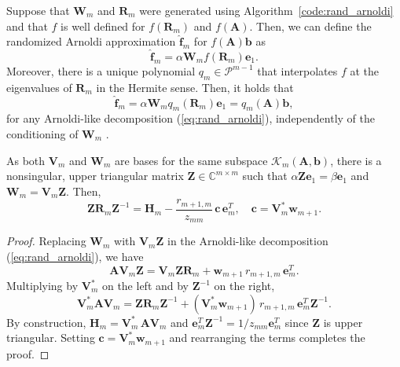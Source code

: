 \documentclass[smallextended]{svjour3}
\renewcommand{\vec}[1]{\mathbf{#1}}
\newcommand{\mat}[1]{\mathbf{#1}}
\begin{document}
\begin{proposition}
Suppose that $\mat{W}_m$ and $\mat{R}_m$ were generated using Algorithm~\ref{code:rand_arnoldi} and that $f$ is well defined for $f(\mat{R}_m)$ and $f(\mat{A})$. Then, we can define the randomized Arnoldi approximation
$\vec{\hat{f}}_m$ for $f(\mat{A})\vec{b}$ as
\begin{equation}
\label{eq:rand_arnoldi_approx}
\vec{\hat{f}}_m = \alpha \mat{W}_m f(\mat{R}_m) \vec{e}_1.
\end{equation}
Moreover, there is a unique polynomial $q_m \in \mathcal{P}^{m - 1}$ that interpolates $f$ at the eigenvalues of $\mat{R}_m$ in the Hermite sense. Then, it holds that
\begin{equation}
\label{eq:rand_arnoldi_polynomial}
\vec{\hat{f}}_m = \alpha \mat{W}_m q_m(\mat{R}_m) \vec{e}_1 = q_m(\mat{A}) \vec{b},
\end{equation}
for any Arnoldi-like decomposition (\ref{eq:rand_arnoldi}), independently of the conditioning of $\mat{W}_m$ \cite[Corollary 2.3]{guttel_randomized_2023}.
\end{proposition}

\begin{lemma}
\label{theorem:similarity}
As both $\mat{V}_m$ and $\mat{W}_m$ are bases for the same subspace $\mathcal{K}_m(\mat{A}, \vec{b})$, there is a nonsingular, upper triangular matrix $\mat{Z} \in \mathbb{C}^{m \times m}$ such that $\alpha \mat{Z}\vec{e}_1 = \beta \vec{e}_1$ and $\mat{W}_m = \mat{V}_m \mat{Z}$. Then,
\begin{equation}
\label{eq:similarity}
\mat{Z} \mat{R}_m \mat{Z}^{-1} = \mat{H}_m - \frac{r_{m+1, m}}{z_{mm}} \, \vec{c} \, \vec{e}_m^T, \quad \vec{c} = \mat{V}_m^* \vec{w}_{m + 1}.
\end{equation}
\end{lemma}
\begin{proof}
   Replacing $\mat{W}_m$ with $\mat{V}_m \mat{Z}$ in the Arnoldi-like decomposition (\ref{eq:rand_arnoldi}), we have
   \begin{equation*}
     \mat{A} \mat{V}_m \mat{Z} = \mat{V}_m \mat{Z} \mat{R}_m + \vec{w}_{m + 1} \, r_{m + 1, m} \, \vec{e}^T_m.
   \end{equation*}
   Multiplying by $\mat{V}_m^*$ on the left and by $\mat{Z}^{-1}$ on the right,
      \begin{equation*}
     \mat{V}_m^* \mat{A} \mat{V}_m =  \mat{Z} \mat{R}_m \mat{Z}^{-1} + (\mat{V}_m^* \vec{w}_{m + 1}) \, r_{m + 1, m} \, \vec{e}^T_m \mat{Z}^{-1}.
   \end{equation*}
   By construction, $\mat{H}_m = \mat{V}_m^* \, \mat{A} \mat{V}_m$ and $\vec{e}_m^T \mat{Z}^{-1} = 1 / z_{mm} \vec{e}_m^T$ since $\mat{Z}$ is upper triangular. Setting $\vec{c} = \mat{V}_m^* \vec{w}_{m + 1}$ and rearranging the terms completes the proof.
\end{proof}
\end{document}
